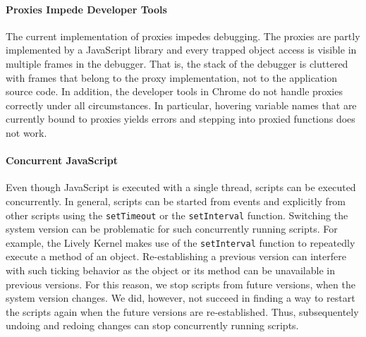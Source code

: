 \paragraph{Proxies Impede Developer Tools}
The current implementation of proxies impedes debugging.
The proxies are partly implemented by a JavaScript library and every trapped object access is visible in multiple frames in the debugger.
That is, the stack of the debugger is cluttered with frames that belong to the proxy implementation, not to the application source code.
In addition, the developer tools in Chrome do not handle proxies correctly under all circumstances.
In particular, hovering variable names that are currently bound to proxies yields errors and stepping into proxied functions does not work.

\paragraph{Concurrent JavaScript}
Even though JavaScript is executed with a single thread, scripts can be executed concurrently.
In general, scripts can be started from events and explicitly from other scripts using the \lstinline{setTimeout} or the \lstinline{setInterval} function.
Switching the system version can be problematic for such concurrently running scripts.
For example, the Lively Kernel makes use of the \lstinline{setInterval} function to repeatedly execute a method of an object.
Re-establishing a previous version can interfere with such ticking behavior as the object or its method can be unavailable in previous versions.
For this reason, we stop scripts from future versions, when the system version changes.
We did, however, not succeed in finding a way to restart the scripts again when the future versions are re-established.
Thus, subsequentely undoing and redoing changes can stop concurrently running scripts.



